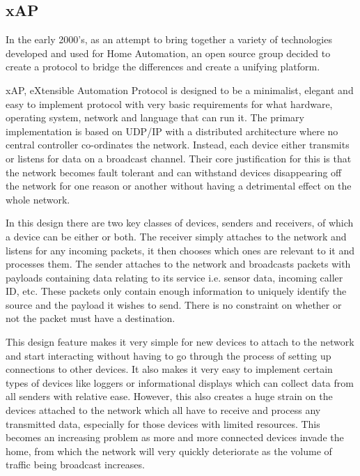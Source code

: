 \newpage


\subsection{xAP} %
\label{sub:xap}

In the early 2000's, as an attempt to bring together a variety of technologies developed and used for Home Automation, an open source group decided to create a protocol to bridge the differences and create a unifying platform.\cite{xAP}

xAP, eXtensible Automation Protocol is designed to be a minimalist, elegant and easy to implement protocol with very basic requirements for what hardware, operating system, network and language that can run it.  
The primary implementation is based on UDP/IP with a distributed architecture where no central controller co-ordinates the network. Instead, each device either transmits or listens for data on a broadcast channel. Their core justification for this is that the network becomes fault tolerant and can withstand devices disappearing off the network for one reason or another without having a detrimental effect on the whole network.

In this design there are two key classes of devices, senders and receivers, of which a device can be either or both. 
The receiver simply attaches to the network and listens for any incoming packets, it then chooses which ones are relevant to it and processes them.
The sender attaches to the network and broadcasts packets with payloads containing data relating to its service i.e. sensor data, incoming caller ID, etc. These packets only contain enough information to uniquely identify the source and the payload it wishes to send. There is no constraint on whether or not the packet must have a destination.

This design feature makes it very simple for new devices to attach to the network and start interacting without having to go through the process of setting up connections to other devices. It also makes it very easy to implement certain types of devices like loggers or informational displays which can collect data from all senders with relative ease. However, this also creates a huge strain on the devices attached to the network which all have to receive and process any transmitted data, especially for those devices with limited resources. This becomes an increasing problem as more and more connected devices invade the home, from which the network will very quickly deteriorate as the volume of traffic being broadcast increases.

